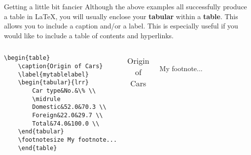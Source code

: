 \documentclass[fleqn, table, 10pt]{beamer}
\def\results{S:/trainings/exporting_stata_tables_figures/results}
\begin{document}
\begin{frame}[fragile]{Getting a little bit fancier}
    Although the above examples all successfully produce a table in \LaTeX{}, you will usually enclose your \textbf{tabular} within a \textbf{table}. This allows you to include a caption and/or a label. This is especially useful if you would like to include a table of contents and hyperlinks.

    \begin{columns}[t]
            {\footnotesize
            \begin{verbatim}
\begin{table}
    \caption{Origin of Cars}
    \label{mytablelabel}
    \begin{tabular}{lrr}
        Car type&No.&\% \\
        \midrule
        Domestic&52.0&70.3 \\
        Foreign&22.0&29.7 \\
        Total&74.0&100.0 \\
    \end{tabular}
    \footnotesize My footnote...
    \end{table}
            \end{verbatim}
            }
        \begin{table}
            \caption{Origin of Cars}
            \label{mytablelabel}
            \begin{tabular}{lrr}
                 
            \end{tabular}\\
            \footnotesize My footnote...
        \end{table}
    \end{columns}
\end{frame}
\end{document}

